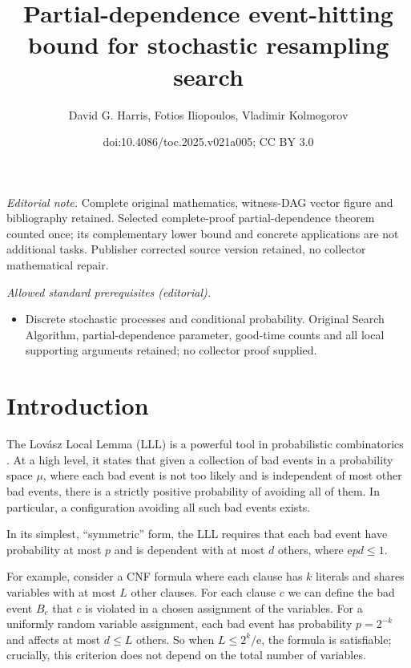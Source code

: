 \documentclass[11pt]{article}
\title{Partial-dependence event-hitting bound for stochastic resampling search}
\author{David G. Harris, Fotios Iliopoulos, Vladimir Kolmogorov}
\date{doi:10.4086/toc.2025.v021a005; CC BY 3.0}
\newcommand{\eee}{\mathrm e}
\begin{document}
\maketitle
\noindent\textit{Editorial note.} Complete original mathematics, witness-DAG vector figure and bibliography retained. Selected complete-proof partial-dependence theorem counted once; its complementary lower bound and concrete applications are not additional tasks. Publisher corrected source version retained, no collector mathematical repair.\par\medskip
\noindent\textit{Allowed standard prerequisites (editorial).}\begin{itemize}
\item Discrete stochastic processes and conditional probability. Original Search Algorithm, partial-dependence parameter, good-time counts and all local supporting arguments retained; no collector proof supplied.
\end{itemize}\medskip
\section{Introduction}
The Lov\'{a}sz Local Lemma  (LLL) is a powerful tool in probabilistic combinatorics \cite{LLL}. At a high level, it states that given a collection of bad events in a probability space $\mu$, where each bad event is  not too likely and is independent of most other bad events, there is a strictly positive probability of avoiding all of them. In particular, a configuration avoiding all such bad events exists. 

In its simplest, ``symmetric'' form, the LLL requires that each 
bad event %
%
%
%
%
have  %
probability at most $p$ and is dependent with at most $d$ others,
where $\eee p d \leq 1$.  

For example, consider a CNF formula where each clause has $k$ literals and shares variables with at most $L$ other clauses. For each clause $c$ we can define the bad event $B_c$ that $c$ is violated in a chosen assignment of the variables. For a uniformly random variable assignment, each bad event has probability $p = 2^{-k}$ and affects at most $d \leq L$ others. So when
%
%
$L \leq 2^k/\eee$,   %
the formula is satisfiable; crucially, this criterion does not depend on the total number of variables.
\end{document}
